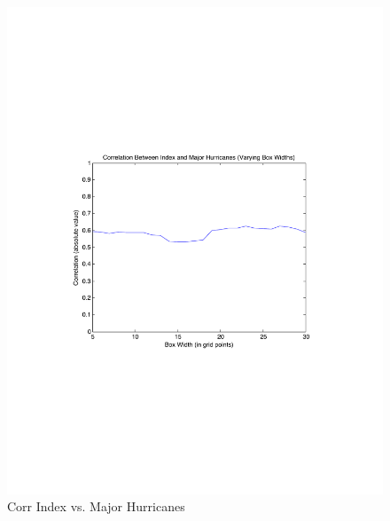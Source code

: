 \documentclass[]{article}
\begin{document}
\begin{figure}[ht]
\begin{minipage}[b]{0.6\linewidth}
\includegraphics[width=\textwidth]{figures/sensitivityResults/boxSize/Major_Hurricanes_Index_Box_Size.pdf}
\caption{Corr Index vs. Major Hurricanes}
\label{fig:figure2}
\end{minipage}
\end{figure}
\end{document}
